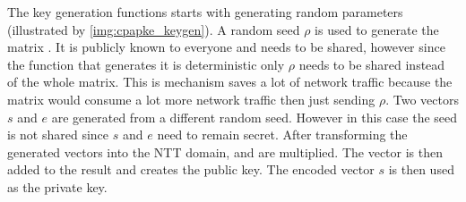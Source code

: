 The key generation functions starts with generating random parameters (illustrated by \ref{img:cpapke_keygen}). A random seed $\rho$ is used to generate the matrix . It is publicly known to everyone and needs to be shared, however since the function that generates it is deterministic only $\rho$ needs to be shared instead of the whole matrix. This is mechanism saves a lot of network traffic because the matrix  would consume a lot more network traffic then just sending $\rho$. Two vectors $s$ and $e$ are generated from a different random seed. However in this case the seed is not shared since $s$ and $e$ need to remain secret. After transforming the generated vectors into the NTT domain,  and  are multiplied. The vector  is then added to the result and creates the public key. The encoded vector $s$ is then used as the private key.

